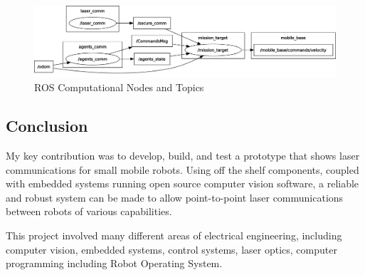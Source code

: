 \documentclass[botnum, fleqn]{unmeethesis}
\begin{document}
\begin{figure}[ht]
 \begin{center}
  \includegraphics[width=0.8 \textwidth]{figures/rosgraph_full.png}
  \caption{\small \label{fig:rosgraph} ROS Computational Nodes and Topics}
 \end{center}
\end{figure}
\clearpage
\subsection*{Conclusion}
My key contribution was to develop, build, and test a prototype that shows laser communications for small mobile robots. Using off the shelf components, coupled with embedded systems running open source computer vision software, a reliable and robust system can be made to allow point-to-point laser communications between robots of various capabilities. 

This project involved many different areas of electrical engineering, including computer vision, embedded systems, control systems, laser optics, computer programming including Robot Operating System. 




\end{document}
